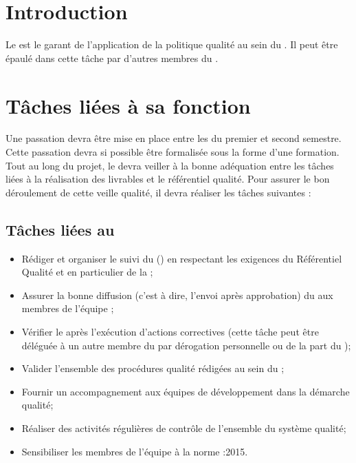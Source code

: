 \documentclass[11pt]{article}
\begin{document}

\section*{Introduction}

Le \RQ{} est le garant de l’application de la politique qualité au sein du \PICCourt. Il peut être épaulé dans cette tâche par d’autres membres du \PICCourt.

\section*{Tâches liées à sa fonction}

Une passation devra être mise en place entre les \RQs{} du premier et second semestre. Cette passation devra si possible être formalisée sous la forme d’une formation.\\
Tout au long du projet, le \RQ{} devra veiller à la bonne adéquation entre les tâches liées à la réalisation des livrables et le référentiel qualité. Pour assurer le bon déroulement de cette veille qualité, il devra réaliser les tâches suivantes :

\subsection*{Tâches liées au \PQCourt}
\begin{itemize}

	\item Rédiger et organiser le suivi du \PQ (\PQCourt) en respectant les exigences du Référentiel Qualité et en particulier de la \DGQDEUXCourt;
	\item Assurer la bonne diffusion (c’est à dire, l’envoi après approbation) du \PQCourt{} aux membres de l’équipe \PICCourt;
	\item Vérifier le \PQCourt{} après l’exécution d’actions correctives (cette tâche peut être déléguée à un autre membre du \PICCourt par dérogation personnelle ou de la part du \CP);


	\item Valider l’ensemble des procédures qualité rédigées au sein du \PICCourt;
	\item Fournir un accompagnement aux équipes de développement dans la démarche qualité;
	\item Réaliser des activités régulières de contrôle de l’ensemble du système qualité;
	\item Sensibiliser les membres de l’équipe \PICCourt{} à la norme :2015.
\end{itemize}
\end{document}
